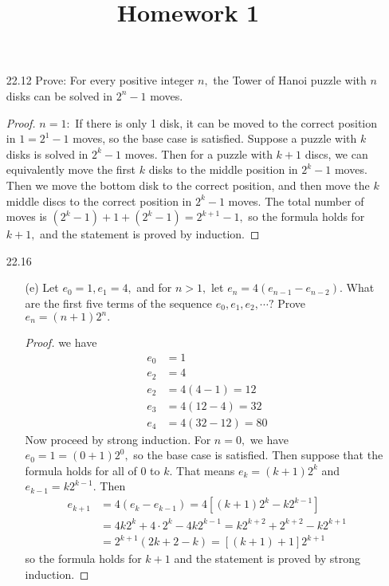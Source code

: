 \documentclass{article}
\begin{document}
\title{Homework 1}
\maketitle
\thispagestyle{fancy}

\begin{itemize}
	\item[22.12] Prove: For every positive integer $n,$ the Tower of Hanoi puzzle with $n$ disks can be solved in $2^n-1$ moves.
		\begin{proof}
			$n=1:$ If there is only 1 disk, it can be moved to the correct position in $1=2^1-1$ moves, so the base case is satisfied. Suppose a puzzle with $k$ disks is solved in $2^k-1$ moves. Then for a puzzle with $k+1$ discs, we can equivalently move the first $k$ disks to the middle position in $2^k-1$ moves. Then we move the bottom disk to the correct position, and then move the $k$ middle discs to the correct position in $2^k-1$ moves. The total number of moves is $(2^k-1)+1+(2^k-1)=2^{k+1}-1,$ so the formula holds for $k+1,$ and the statement is proved by induction.
		\end{proof}

	\item[22.16]
		\begin{itemize}
			\item[(e)] Let $e_0=1, e_1=4,$ and for $n>1,$ let $e_n=4(e_{n-1}-e_{n-2}).$ What are the first five terms of the sequence $e_0, e_1, e_2, \cdots?$ Prove $e_n=(n+1)2^n.$
				\begin{proof}
					we have
					\begin{align*}
						e_0 &= 1 \\
						e_2 &= 4 \\
						e_2 &= 4(4-1)=12 \\
						e_3 &= 4(12-4)=32 \\
						e_4 &= 4(32-12)=80
					\end{align*}
					Now proceed by strong induction. For $n=0,$ we have $e_0=1=(0+1)2^0,$ so the base case is satisfied. Then suppose that the formula holds for all of 0 to $k.$ That means $e_k=(k+1)2^k$ and $e_{k-1}=k2^{k-1}.$ Then
					\begin{align*}
						e_{k+1} &= 4(e_k-e_{k-1}) = 4\left[ (k+1)2^k-k2^{k-1} \right] \\
						&= 4k2^k+4\cdot 2^k - 4k2^{k-1} = k2^{k+2}+2^{k+2}-k2^{k+1} \\
						&= 2^{k+1}(2k+2-k)=\left[ (k+1)+1 \right]2^{k+1}
					\end{align*}
					so the formula holds for $k+1$ and the statement is proved by strong induction.
				\end{proof}
				

\end{itemize}
\end{itemize}
\end{document}
